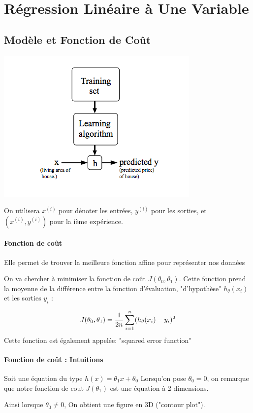 \documentclass{article}
\theoremstyle{definition}
\begin{document}
\section{Régression Linéaire à Une Variable}
\subsection{Modèle et Fonction de Coût}
\includegraphics{model} \par
On utilisera $x^{(i)}$ pour dénoter les entrées, $y^{(i)}$ pour les sorties, et $(x^{(i)},y^{(i)})$ pour la ième expérience. \par
\paragraph{Fonction de coût}
Elle permet de trouver la meilleure fonction affine pour représenter nos données \par
On va chercher à minimiser la fonction de coût $J(\theta_0 , \theta_1)$. Cette fonction prend la moyenne de la différence entre la fonction d'évaluation, "d'hypothèse" $h_\theta (x_i)$ et les sorties $y_i$ : \par
\begin{equation} \label{eu_eqn}
J(\theta_0 , \theta_1) = {1\over 2n} \sum_{i=1}^{n} (h_\theta (x_i) - y_i)^2
\end{equation}
Cette fonction est également appelée: "squared error function"
\paragraph{Fonction de coût : Intuitions}
Soit une équation du type $h(x) = \theta_1x + \theta_0$ Lorsqu'on pose $\theta_0 = 0$, on remarque que notre fonction de cout $J(\theta_1)$ est une équation à 2 dimensions. \par
Ainsi lorsque $\theta_0 \ne 0$, On obtient une figure en 3D ("contour plot"). \par
\end{document}
